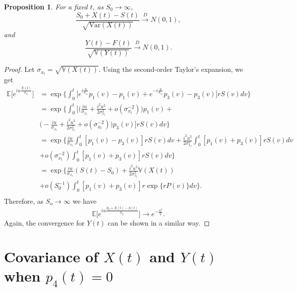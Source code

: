 \documentclass[10pt]{article}
\newtheorem{proposition}{Proposition}
\newcommand{\Var}{\mathbb{V}}
\newcommand{\EE}{\mathbb{E}}
\begin{document}
\begin{proposition}
For a fixed $t$, as $S_0 \rightarrow \infty$,
\begin{equation*}
\frac{S_0+X(t) - S(t)}{\sqrt{\text{Var}(X(t))}} \overset{D}{\rightarrow} N(0, 1),
\end{equation*}
and
\begin{equation*}
\frac{Y(t) - F(t)}{\sqrt{\Var(Y(t))}} \overset{D}{\rightarrow} N(0, 1).
\end{equation*}
\end{proposition}
\begin{proof}
Let $\sigma_{x_t} = \sqrt{\Var(X(t))}$. Using the second-order Taylor's expansion, we get
\begin{equation*}
\begin{split}
\EE \Big[e^{iu \frac{X(t)}{\sigma_{x_t}}} \Big] &= \exp \Big\{  \int_0^t \Big[ e^{i \frac{u}{\sigma_{x_t}}}p_1(v) - p_1(v) + e^{-i \frac{u}{\sigma_{x_t}}}p_3(v) - p_3(v)\Big] r S(v) dv\Big\} \\
& = \exp \Big\{ \int_0^t \Big[ \Big( \frac{iu}{\sigma_{x_t}} + \frac{i^2 u^2}{2 \sigma^2_{x_t}} + o(\sigma^{-2}_{x_t}) \Big) p_1(v) + \\
& \Big(- \frac{iu}{\sigma_{x_t}} + \frac{i^2 u^2}{2 \sigma^2_{x_t}} + o(\sigma^{-2}_{x_t}) \Big) p_3(v)  \Big] r S(v) dv\Big\} \\
& = \exp \Big\{ \frac{iu}{\sigma_{x_t}} \int_0^t  [p_1(v) - p_3(v)] r S(v) dv + \frac{i^2u^2}{2\sigma^2_{x_t}}\int_0^t  [p_1(v) + p_3(v)] r S(v) dv \\
& +  o (\sigma^{-2}_{x_t})\int_0^t [p_1(v) + p_3(v)] r S(v) dv \Big\} \\
& = \exp \Big\{ \frac{iu}{\sigma_{x_t}} (S(t)-S_0) + \frac{i^2u^2}{2\sigma^2_{x_t}}\Var(X(t)) \\
& +  o (S_0^{-1})\int_0^t [p_1(v) + p_3(v)] r \exp\{r P(v)\} dv \Big\}. \\
\end{split}
\end{equation*}
Therefore, as $S_o\to \infty$ we have
$$ 
\EE\Big[ e^{iu \frac{S_0+X(t)-S(t)} {\sigma_{x_t}}} \Big]  \rightarrow e^{- \frac{u^2}{2 }}.
$$
Again, the convergence for $Y(t)$ can be shown in a similar way. 
\end{proof}

\section{Covariance of $X(t)$ and $Y(t)$ when $p_4(t) = 0$}
\end{document}
